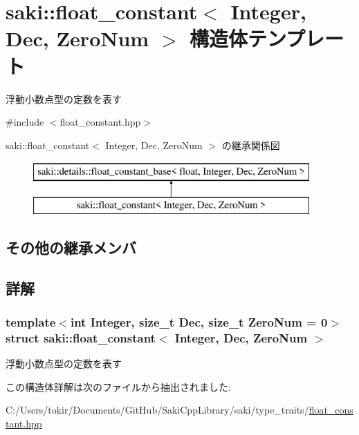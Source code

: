 \hypertarget{structsaki_1_1float__constant}{}\section{saki\+:\+:float\+\_\+constant$<$ Integer, Dec, Zero\+Num $>$ 構造体テンプレート}
\label{structsaki_1_1float__constant}


浮動小数点型の定数を表す  




{\ttfamily \#include $<$float\+\_\+constant.\+hpp$>$}

saki\+:\+:float\+\_\+constant$<$ Integer, Dec, Zero\+Num $>$ の継承関係図\begin{figure}[H]
\begin{center}
\leavevmode
\includegraphics[height=2.000000cm]{structsaki_1_1float__constant}
\end{center}
\end{figure}
\subsection*{その他の継承メンバ}


\subsection{詳解}
\subsubsection*{template$<$int Integer, size\+\_\+t Dec, size\+\_\+t Zero\+Num = 0$>$\newline
struct saki\+::float\+\_\+constant$<$ Integer, Dec, Zero\+Num $>$}

浮動小数点型の定数を表す 

この構造体詳解は次のファイルから抽出されました\+:\begin{DoxyCompactItemize}
\item 
C\+:/\+Users/tokir/\+Documents/\+Git\+Hub/\+Saki\+Cpp\+Library/saki/type\+\_\+traits/\mbox{\hyperlink{float__constant_8hpp}{float\+\_\+constant.\+hpp}}\end{DoxyCompactItemize}
